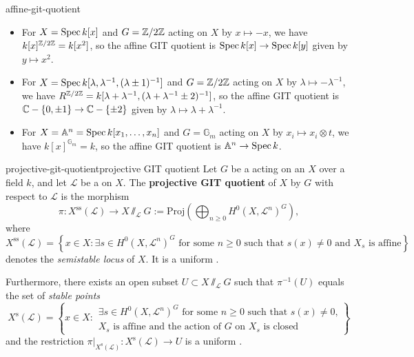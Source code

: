 \begin{example}{affine-git-quotient}
    \begin{itemize}
        \item For $X = \operatorname{Spec} k[x]$ and $G = \mathbb{Z}/2\mathbb{Z}$ acting on $X$ by $x \mapsto -x$, we have $k[x]^{\mathbb{Z}/2\mathbb{Z}} = k[x^2]$, so the affine GIT quotient is $\operatorname{Spec} k[x] \to \operatorname{Spec} k[y]$ given by $y \mapsto x^2$.
        \item For $X = \operatorname{Spec} k[\lambda, \lambda^{-1}, (\lambda \pm 1)^{-1}]$ and $G = \mathbb{Z}/2\mathbb{Z}$ acting on $X$ by $\lambda \mapsto -\lambda^{-1}$, we have $R^{\mathbb{Z}/2\mathbb{Z}} = k[\lambda + \lambda^{-1}, (\lambda + \lambda^{-1} \pm 2)^{-1}]$, so the affine GIT quotient is $\mathbb{C} - \{ 0, \pm 1 \} \to \mathbb{C} - \{ \pm 2 \}$ given by $\lambda \mapsto \lambda + \lambda^{-1}$.
        \item For $X = \mathbb{A}^n = \operatorname{Spec} k[x_1, \ldots, x_n]$ and $G = \mathbb{G}_m$ acting on $X$ by $x_i \mapsto x_i \otimes t$, we have $k[x]^{\mathbb{G}_m} = k$, so the affine GIT quotient is $\mathbb{A}^n \to \operatorname{Spec} k$.
    \end{itemize}
\end{example}

\begin{topic}{projective-git-quotient}{projective GIT quotient}
    Let $G$ be a   acting on an  $X$ over a field $k$, and let $\mathcal{L}$ be a   on $X$. The \textbf{projective GIT quotient} of $X$ by $G$ with respect to $\mathcal{L}$ is the morphism
    \[ \pi : X^\text{ss}(\mathcal{L}) \to X \sslash_\mathcal{L} G := \text{Proj}\left(\bigoplus_{n \ge 0} H^0(X, \mathcal{L}^n)^G \right) , \]
    where
    \[ X^\text{ss}(\mathcal{L}) = \left\{ x \in X : \exists s \in H^0(X, \mathcal{L}^n)^G \text{ for some $n \ge 0$ such that $s(x) \ne 0$ and $X_s$ is affine} \right\} \]
    denotes the \textit{semistable locus} of $X$. It is a uniform .
    
    Furthermore, there exists an open subset $U \subset X \sslash_\mathcal{L} G$ such that $\pi^{-1}(U)$ equals the set of \textit{stable points} \[ X^\text{s}(\mathcal{L}) = \left\{ x \in X : \begin{array}{c} \exists s \in H^0(X, \mathcal{L}^n)^G \text{ for some $n \ge 0$ such that $s(x) \ne 0$,} \\ \text{$X_s$ is affine and the action of $G$ on $X_s$ is closed} \end{array} \right\} \]
    and the restriction $\pi|_{X^\text{s}(\mathcal{L})} : X^\text{s}(\mathcal{L}) \to U$ is a uniform .
\end{topic}

